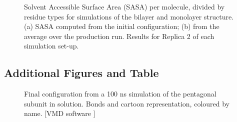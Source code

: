 \begin{figure}[t!]
\centering
{} 
\caption[Replica 2: SASA per residue of monolayer and bilater]{Solvent Accessible Surface Area (SASA) per molecule, divided by residue types for simulations of the bilayer and monolayer structure. (a) SASA computed from the initial configuration; (b) from the average over the production run. Results for Replica 2 of each simulation set-up.}
\label{fig:mono_bi_sasa2}
\end{figure}

\clearpage


\subsection{Additional Figures and Table}
\begin{figure}[h!]
\centering
\caption[Final configuration of a pentagonal subunit simulation]{Final configuration from a 100 ns simulation of the pentagonal subunit in solution. Bonds and cartoon representation, coloured by name. [VMD software \citet{HUMP96}]}
\label{fig:penta_results_SI}
\end{figure}

